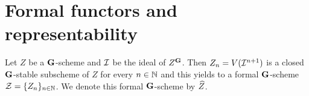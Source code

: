 \section{Formal functors and representability}

        

        \begin{example}\label{algebraicformalgroupschemes}
            Let $Z$ be a $\mathbf{G}$-scheme and ${\mathcal I}$ be the ideal of
            $Z^{\mathbf{G}}$. Then $Z_n=V({\mathcal I}^{n+1})$ is a closed $\mathbf{G}$-stable
            subscheme of $Z$ for every $n\in {\mathbb N}$ and this yields to a formal
            $\mathbf{G}$-scheme ${\mathcal Z}=\{Z_n\}_{n\in {\mathbb N}}$. We denote this formal
            $\mathbf{G}$-scheme by $\widehat{Z}$.
        \end{example}


